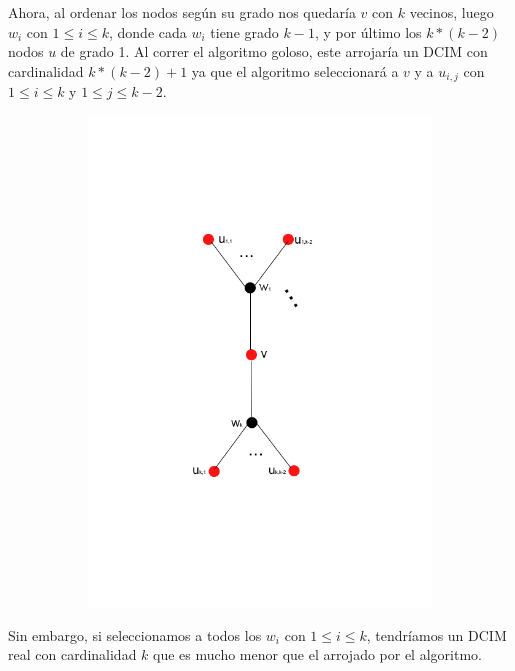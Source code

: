  Ahora, al ordenar los nodos según su grado nos quedaría $v$ con $k$ vecinos, luego $w_i$ con $1 \leq i \leq k$, donde cada $w_i$ tiene grado $k-1$, y por último los $k * (k-2)$ nodos $u$ de grado 1. Al correr el algoritmo goloso, este arrojaría un DCIM con cardinalidad $k * (k-2) + 1$ ya que el algoritmo seleccionará a $v$ y a $u_{i,j}$ con $1 \leq i \leq k$ y $1 \leq j \leq k-2$. \\ 

\begin{figure}[H]
\centering
\begin{subfigure}[b]{0.5\textwidth}
                \includegraphics[width=\textwidth]{imagenes/grafos-ej3-tp3-2.png}
                \caption{}
        \end{subfigure}%
\end{figure}


 Sin embargo, si seleccionamos a todos los  $w_i$ con $1 \leq i \leq k$, tendríamos un DCIM real con cardinalidad $k$ que es mucho menor que el arrojado por el algoritmo.

